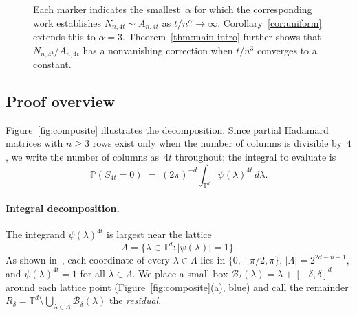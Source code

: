 \documentclass[11pt]{article}
\theoremstyle{definition}
\newcommand{\Prb}{\mathbb{P}}
\newcommand{\TT}{\mathbb{T}}
\newcommand{\Bbox}{\mathcal{B}}
\begin{document}
\begin{figure}[t]
\caption{Each marker indicates the smallest~\(\alpha\) for which the corresponding work establishes \(N_{n,4t}\sim A_{n,4t}\) as \(t/n^\alpha\to\infty\). Corollary~\ref{cor:uniform} extends this to \(\alpha=3\). Theorem~\ref{thm:main-intro} further shows that \(N_{n,4t}/A_{n,4t}\) has a nonvanishing correction when \(t/n^3\) converges to a constant.}\label{fig:regimes}
\end{figure}

\subsection{Proof overview}\label{sec:proof-overview}

Figure~\ref{fig:composite} illustrates the decomposition. Since partial Hadamard matrices with \(n\ge 3\) rows exist only when the number of columns is divisible by~\(4\), we write the number of columns as~\(4t\) throughout; the integral to evaluate is
\begin{equation}\label{eq:fourier-4t}
  \Prb(S_{4t}=0)
  \;=\;
  (2\pi)^{-d}\int_{\TT^d}\psi(\lambda)^{4t}\,d\lambda.
\end{equation}

\paragraph{Integral decomposition.}
The integrand \(\psi(\lambda)^{4t}\) is largest near the lattice
\[
  \Lambda=\{\lambda\in\TT^d:|\psi(\lambda)|=1\}.
\]
As shown in~\cite[Lemmas~2.2--2.3]{DL10}, each coordinate of every \(\lambda\in\Lambda\) lies in \(\{0,\pm\pi/2,\pi\}\), \(|\Lambda|=2^{2d-n+1}\), and \(\psi(\lambda)^{4t}=1\) for all \(\lambda\in\Lambda\). We place a small box \(\Bbox_\delta(\lambda)=\lambda+[-\delta,\delta]^d\) around each lattice point (Figure~\ref{fig:composite}(a), blue) and call the remainder \(R_\delta=\TT^d\setminus\bigcup_{\lambda\in\Lambda}\Bbox_\delta(\lambda)\) the \emph{residual}.
\end{document}
